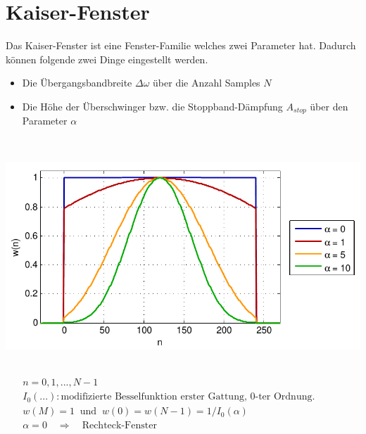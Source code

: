 	\section{Kaiser-Fenster}
		\vspace*{-0.2cm}
		\begin{minipage}{0.52\textwidth}
			Das Kaiser-Fenster ist eine Fenster-Familie welches zwei Parameter hat. Dadurch können folgende zwei Dinge eingestellt werden.\\[-0.2cm]
			\begin{itemize}
			 \item Die Übergangsbandbreite $\Delta\omega$ über die Anzahl Samples $N$\\[-0.2cm]
			 \item Die Höhe der Überschwinger bzw. die Stoppband-Dämpfung $A_{stop}$ über den Parameter $\alpha$
			\end{itemize}
		\end{minipage}\begin{minipage}{0.03\textwidth}$ $\end{minipage}
		\begin{minipage}{0.45\textwidth}
		 \includegraphics[width = \textwidth]{pic/KaiserFenster.pdf}
		\end{minipage}\\[0.1cm]
		$\quad$
		$\begin{array}{l}n = 0,1,...,N-1\\[0.15cm] I_0(...):  \text{modifizierte Besselfunktion erster Gattung, 0-ter Ordnung.}\\[0.15cm] w(M) = 1 \;\;\text{und}\;\; w(0) = w(N-1) = 1/I_0(\alpha)\\[0.15cm] \alpha = 0\quad\Rightarrow\quad \text{Rechteck-Fenster}\end{array}$\\[0.4cm]
